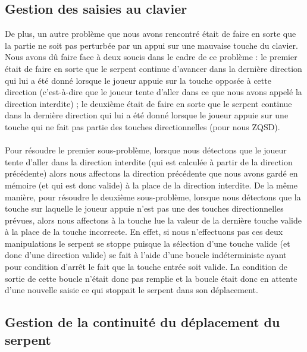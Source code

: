 \documentclass[11pt,a4paper]{article}
\begin{document}
        \subsection{Gestion des saisies au clavier}
        \setlength{\parindent}{1cm}
        De plus, un autre problème que nous avons rencontré était de faire en sorte que la partie ne soit pas perturbée par un appui sur une mauvaise touche du clavier. Nous avons dû faire face à deux soucis dans le cadre de ce problème : le premier était de faire en sorte que le serpent continue d’avancer dans la dernière direction qui lui a été donné lorsque le joueur appuie sur la touche opposée à cette direction (c’est-à-dire que le joueur tente d’aller dans ce que nous avons appelé la direction interdite) ; le deuxième était de faire en sorte que le serpent continue dans la dernière direction qui lui a été donné lorsque le joueur appuie sur une touche qui ne fait pas partie des touches directionnelles (pour nous ZQSD). \\\\Pour résoudre le premier sous-problème, lorsque nous détectons que le joueur tente d’aller dans la direction interdite (qui est calculée à partir de la direction précédente) alors nous affectons la direction précédente que nous avons gardé en mémoire (et qui est donc valide) à la place de la direction interdite. De la même manière, pour résoudre le deuxième sous-problème, lorsque nous détectons que la touche sur laquelle le joueur appuie n’est pas une des touches directionnelles prévues, alors nous affectons à la touche lue la valeur de la dernière touche valide à la place de la touche incorrecte. En effet, si nous n’effectuons pas ces deux manipulations le serpent se stoppe puisque la sélection d’une touche valide (et donc d’une direction valide) se fait à l’aide d’une boucle indéterministe ayant pour condition d’arrêt le fait que la touche entrée soit valide. La condition de sortie de cette boucle n’était donc pas remplie et la boucle était donc en attente d’une nouvelle saisie ce qui stoppait le serpent dans son déplacement.
        
        \subsection{Gestion de la continuité du déplacement du serpent}
\end{document}
